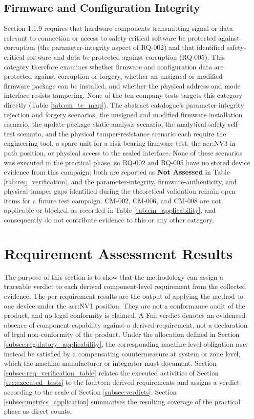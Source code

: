 \subsection{Firmware and Configuration Integrity}
\label{subsec:cat_config_firmware}
Section 1.1.9 requires that hardware components transmitting signal or data relevant to connection or access to safety-critical software be protected against corruption (the parameter-integrity aspect of RQ-002) and that identified safety-critical software and data be protected against corruption (RQ-005). This category therefore examines whether firmware and configuration data are protected against corruption or forgery, whether an unsigned or modified firmware package can be installed, and whether the physical address and mode interface resists tampering. None of the ten company tests targets this category directly (Table \ref{tab:cm_tc_map}). The abstract catalogue's parameter-integrity rejection and forgery scenarios, the unsigned and modified firmware installation scenario, the update-package static-analysis scenario, the analytical safety-self-test scenario, and the physical tamper-resistance scenario each require the engineering tool, a spare unit for a risk-bearing firmware test, the \gls{acr:NV3} in-path position, or physical access to the sealed interface. None of these scenarios was executed in the practical phase, so RQ-002 and RQ-005 have no stored device evidence from this campaign; both are reported as \textbf{Not Assessed} in Table \ref{tab:req_verification}, and the parameter-integrity, firmware-authenticity, and physical-tamper gaps identified during the theoretical validation remain open items for a future test campaign. CM-002, CM-006, and CM-008 are not applicable or blocked, as recorded in Table \ref{tab:cm_applicability}, and consequently do not contribute evidence to this or any other category.


\section{Requirement Assessment Results}
\label{sec:requirement_verification}

The purpose of this section is to show that the methodology can assign a traceable verdict to each derived component-level requirement from the collected evidence. The per-requirement results are the output of applying the method to one device under the \gls{acr:NV1} position. They are not a conformance audit of the product, and no legal conformity is claimed. A Fail verdict denotes an evidenced absence of component capability against a derived requirement, not a declaration of legal non-conformity of the product. Under the allocation defined in Section \ref{subsec:regulatory_applicability}, the corresponding machine-level obligation may instead be satisfied by a compensating countermeasure at system or zone level, which the machine manufacturer or integrator must document. Section \ref{subsec:req_verification_table} relates the executed activities of Section \ref{sec:executed_tests} to the fourteen derived requirements and assigns a verdict according to the scale of Section \ref{subsec:verdicts}. Section \ref{subsec:metrics_application} summarises the resulting coverage of the practical phase as direct counts.


